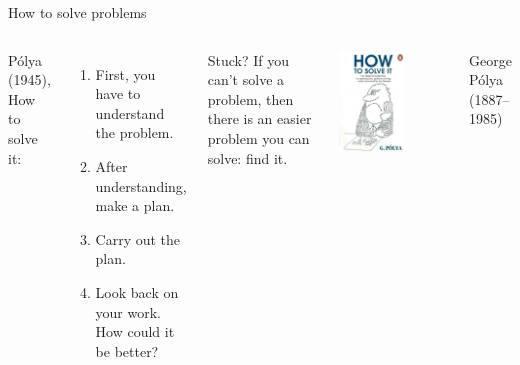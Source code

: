 \documentclass[aspectratio=169,usenames,dvipsnames]{beamer}
\begin{document}
\begin{frame}{How to solve problems}
    \begin{columns}
            Pólya (1945), How to solve it:

            \begin{enumerate}
                \item First, you have to understand the problem.
                \item After understanding, make a plan.
                \item Carry out the plan.
                \item Look back on your work. How could it be better?
            \end{enumerate}

            \begin{block}{Stuck?}
            If you can't solve a problem,
            then there is an easier problem you can solve:
            find it.
            \end{block}
        \centering
            \includegraphics[width=0.6\textwidth]{fig/howtosolveit}

            \vspace{1em} George P\'olya (1887--1985)
    \end{columns}
\end{frame}
\end{document}
